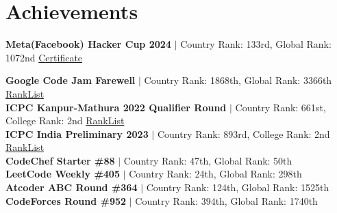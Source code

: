 \documentclass[letterpaper,11pt]{article}
\begin{document}
\section{Achievements}
\begin{itemize}[leftmargin=0.15in, label={}]
    \small{\item{

      
        \textbf{Meta(Facebook) Hacker Cup 2024} {$|$ \textrm{Country Rank: 133rd, Global Rank: 1072nd}} 
        \href{https://www.facebook.com/codingcompetitions/hacker-cup/2024/certificate/1716457385376261}{Certificate} \\
        \vspace{5pt}
        
        \textbf{Google Code Jam Farewell} {$|$ \textrm{Country Rank: 1868th, Global Rank: 3366th}} 
        \href{https://clist.by/account/healthypragun/resource/codingcompetitions.withgoogle.com/}{RankList} \\
        \vspace{5pt}
        \textbf{ICPC Kanpur-Mathura 2022 Qualifier Round} {$|$ \textrm{Country Rank: 661st, College Rank: 2nd}}
        \href{https://codedrills.io/contests/icpc-kanpur-mathura-2022-qualifier-round/teams/30293}{RankList} \\
        \vspace{5pt}
        \textbf{ICPC India Preliminary 2023} {$|$ \textrm{Country Rank: 893rd, College Rank: 2nd}}
        \href{https://codedrills.io/contests/icpc-india-preliminary-2023/teams/57291}{RankList} \\
        \vspace{5pt}
        \textbf{CodeChef Starter \#88} {$|$ \textrm{Country Rank: 47th, Global Rank: 50th}} \\
       \vspace{5pt}
        \textbf{LeetCode Weekly \#405} {$|$ \textrm{Country Rank: 24th, Global Rank: 298th}} \\
       \vspace{5pt}
        \textbf{Atcoder ABC Round \#364} {$|$ \textrm{Country Rank: 124th, Global Rank: 1525th}} \\
        \vspace{5pt}
        \textbf{CodeForces Round \#952} {$|$ \textrm{Country Rank: 394th, Global Rank: 1740th}} \\
}}
\end{itemize}
\end{document}
